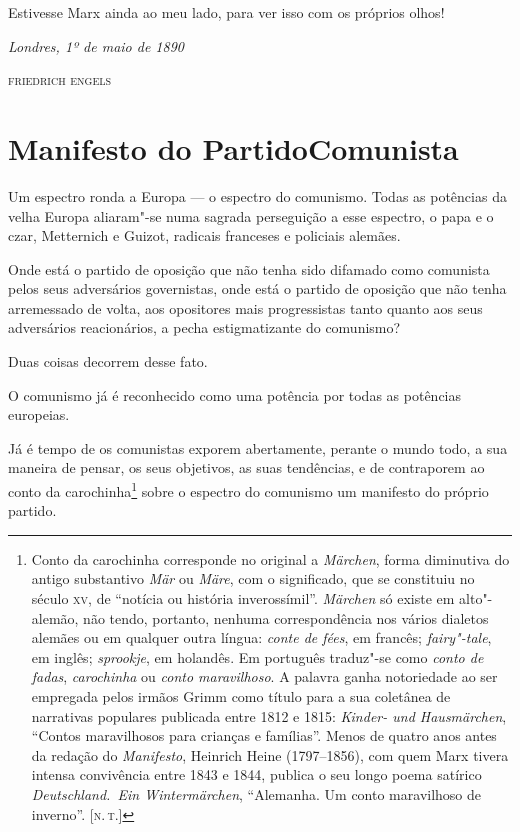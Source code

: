 Estivesse Marx ainda ao meu lado, para ver isso com os próprios olhos!

\bigskip

\hfill\textit{Londres, 1º de maio de 1890}

\hfill\textsc{friedrich engels}


\chapter[Manifesto do Partido Comunista]{Manifesto do Partido\break Comunista}


Um espectro ronda a Europa --- o espectro do comunismo. Todas as 
potências da velha Europa aliaram"-se numa sagrada perseguição a esse 
espectro, o papa e o czar, Metternich e Guizot, radicais franceses e policiais alemães.

Onde está o partido de oposição que não tenha sido difamado como
comunista pelos seus adversários governistas, onde está o partido de
oposição que não tenha arremessado de volta, aos opositores mais
progressistas tanto quanto aos seus adversários reacionários, a pecha
estigmatizante do comunismo?

Duas coisas decorrem desse fato.

O comunismo já é reconhecido como uma potência por todas as potências
europeias.

Já é tempo de os comunistas exporem abertamente, perante o mundo
todo, a sua maneira de pensar, os seus objetivos, as suas tendências, e
de contraporem ao conto da carochinha\footnote{Conto da carochinha corresponde no original a \textit{Märchen}, forma
diminutiva do antigo substantivo \textit{Mär} ou \textit{Märe}, com o
significado, que se constituiu no século \textsc{xv}, de ``notícia ou história
inverossímil''. \textit{Märchen} só existe em alto"-alemão, não tendo,
portanto, nenhuma correspondência  nos vários dialetos alemães ou em
qualquer outra língua: \textit{conte de fées}, em francês;
\textit{fairy"-tale}, em inglês; \textit{sprookje}, em holandês. Em português traduz"-se como \textit{conto de fadas}, \textit{carochinha} ou \textit{conto
maravilhoso}. A palavra ganha notoriedade ao ser empregada pelos irmãos
Grimm como título para a sua coletânea de narrativas populares
publicada entre 1812 e 1815: \textit{Kinder- und Hausmärchen},
``Contos maravilhosos para crianças e famílias''. Menos de quatro     \label{7}
anos antes da redação do \textit{Manifesto}, Heinrich Heine (1797--1856), com quem Marx tivera intensa convivência entre 1843 e 1844,
publica o seu longo poema satírico \textit{Deutschland.~Ein
Wintermärchen}, ``Alemanha. Um conto maravilhoso de inverno''. [\textsc{n.\,t.}]}
sobre o espectro do comunismo um manifesto do próprio partido.

